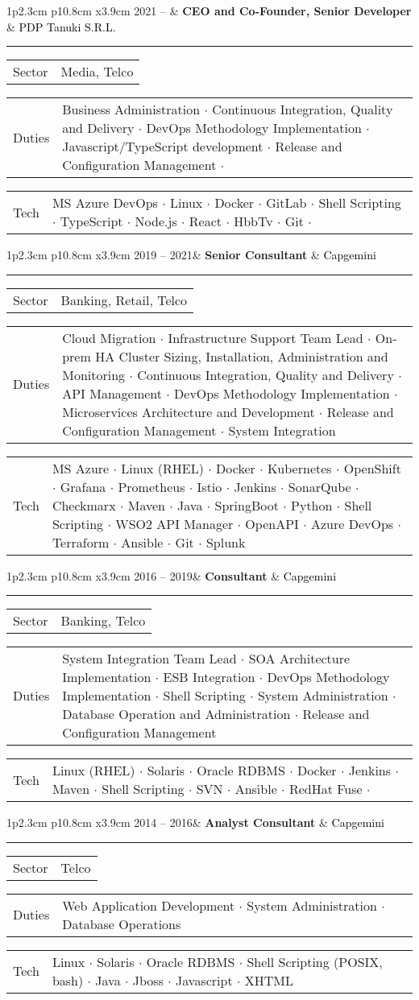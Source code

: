 \documentclass[10pt,A4]{article}
\newcommand{\fancysep}{\textcolor{bgcol}{ $\cdot$} }
\newcommand{\tzlarrow}{(0,0) -- (0.2,0) -- (0.3,0.2) -- (0.2,0.4) -- (0,0.4) -- (0.1,0.2) -- cycle;}
\newcommand{\larrow}[1]
{\begin{tikzpicture}[scale=0.58]
	 \filldraw[fill=#1!100,draw=#1!100!black]  \tzlarrow
 \end{tikzpicture}
}
\newcommand{\cveventheadmy}[2]
{
\vspace{6pt}
	\begin{tabular*}{1\textwidth}{p{2.3cm} p{14.4cm}}
\larrow{bgcol}	\normalsize{\textcolor{bgcol}{#1}}&#2\\[12pt]
	\end{tabular*}
}
\newcommand{\cveventsection}[3]
{
\vspace{8pt}
	\begin{tabular*}{1\textwidth}{p{2.3cm}  p{10.8cm} x{3.9cm}}
 \textcolor{bgcol}{#1}& \textbf{#2} & \vspace{2.5pt}\textcolor{black}{#3}
	\end{tabular*}
\textcolor{softcol}{\hrule}
}
\begin{document}
\cveventsection{2021 – }{CEO and Co-Founder, Senior Developer}{PDP Tanuki S.R.L.}
\cveventheadmy{Sector}
{Media, Telco}
\cveventheadmy{
Duties}{Business Administration \fancysep Continuous Integration, Quality and Delivery \fancysep  
DevOps Methodology Implementation \fancysep
Javascript/TypeScript development \fancysep
Release and Configuration Management \fancysep
}
\cveventheadmy{Tech}
{
MS Azure DevOps \fancysep
Linux \fancysep 
Docker \fancysep 
GitLab \fancysep 
Shell Scripting \fancysep 
TypeScript \fancysep 
Node.js \fancysep
React \fancysep 
HbbTv \fancysep
Git \fancysep
}

%
\cveventsection{2019 – 2021}{Senior Consultant}{Capgemini}
\cveventheadmy{Sector}
{Banking, Retail, Telco}
\cveventheadmy{
Duties}{Cloud Migration \fancysep Infrastructure Support Team Lead \fancysep On-prem HA Cluster Sizing, Installation, Administration and Monitoring \fancysep 
Continuous Integration, Quality and Delivery \fancysep  
API Management \fancysep
DevOps Methodology Implementation \fancysep
Microservices Architecture and Development \fancysep 
Release and Configuration Management \fancysep 
System Integration
}
\cveventheadmy{Tech}
{
MS Azure \fancysep
Linux (RHEL) \fancysep 
Docker \fancysep 
Kubernetes \fancysep 
OpenShift \fancysep
Grafana \fancysep
Prometheus \fancysep
Istio \fancysep 
Jenkins \fancysep 
SonarQube \fancysep 
Checkmarx \fancysep
Maven \fancysep 
Java \fancysep 
SpringBoot \fancysep
Python \fancysep 
Shell Scripting \fancysep 
WSO2 API Manager \fancysep 
OpenAPI \fancysep 
Azure DevOps \fancysep
Terraform \fancysep
Ansible \fancysep
Git \fancysep
Splunk
}


%
\cveventsection{2016 – 2019}{Consultant}{Capgemini}
\cveventheadmy{Sector}{Banking, Telco}
\cveventheadmy{
Duties}
{System Integration Team Lead \fancysep
SOA Architecture Implementation\fancysep
ESB Integration \fancysep
DevOps Methodology Implementation \fancysep
Shell Scripting \fancysep 
System Administration \fancysep
Database Operation and Administration \fancysep
Release and Configuration Management
}
\cveventheadmy{Tech}{
Linux (RHEL) \fancysep 
Solaris \fancysep 
Oracle RDBMS \fancysep 
Docker \fancysep
Jenkins \fancysep 
Maven \fancysep 
Shell Scripting \fancysep 
SVN \fancysep
Ansible \fancysep
RedHat Fuse \fancysep
}


%
\cveventsection{2014 – 2016}{Analyst Consultant}{Capgemini}
\cveventheadmy{Sector}{Telco}
\cveventheadmy{Duties}{
Web Application Development \fancysep
System Administration \fancysep
Database Operations
}
\cveventheadmy{Tech}{
Linux \fancysep 
Solaris \fancysep 
Oracle RDBMS \fancysep 
Shell Scripting (POSIX, bash) \fancysep 
Java \fancysep 
Jboss \fancysep
Javascript \fancysep 
XHTML
}
\end{document}
